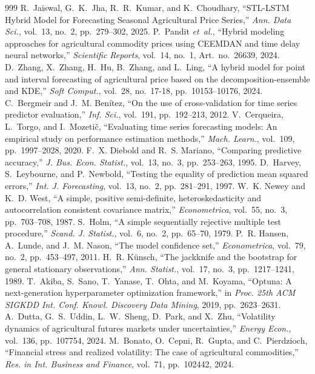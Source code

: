 \begin{thebibliography}{999}
 R.~Jaiswal, G.~K.~Jha, R.~R.~Kumar, and K.~Choudhary, ``STL-LSTM Hybrid Model for Forecasting Seasonal Agricultural Price Series,'' \emph{Ann. Data Sci.}, vol.~13, no.~2, pp.~279--302, 2025.
 P.~Pandit \emph{et~al.}, ``Hybrid modeling approaches for agricultural commodity prices using CEEMDAN and time delay neural networks,'' \emph{Scientific Reports}, vol.~14, no.~1, Art.\ no.~26639, 2024.
 D.~Zhang, X.~Zhang, H.~Hu, B.~Zhang, and L.~Ling, ``A hybrid model for point and interval forecasting of agricultural price based on the decomposition-ensemble and KDE,'' \emph{Soft Comput.}, vol.~28, no.~17-18, pp.~10153--10176, 2024.
 C.~Bergmeir and J.~M. Ben\'{i}tez, ``On the use of cross-validation for time series predictor evaluation,'' \emph{Inf. Sci.}, vol.~191, pp.~192--213, 2012.
 V.~Cerqueira, L.~Torgo, and I.~Mozeti\v{c}, ``Evaluating time series forecasting models: An empirical study on performance estimation methods,'' \emph{Mach. Learn.}, vol.~109, pp.~1997--2028, 2020.
 F.~X. Diebold and R.~S. Mariano, ``Comparing predictive accuracy,'' \emph{J. Bus. Econ. Statist.}, vol.~13, no.~3, pp.~253--263, 1995.
 D.~Harvey, S.~Leybourne, and P.~Newbold, ``Testing the equality of prediction mean squared errors,'' \emph{Int. J. Forecasting}, vol.~13, no.~2, pp.~281--291, 1997.
 W.~K. Newey and K.~D. West, ``A simple, positive semi-definite, heteroskedasticity and autocorrelation consistent covariance matrix,'' \emph{Econometrica}, vol.~55, no.~3, pp.~703--708, 1987.
 S.~Holm, ``A simple sequentially rejective multiple test procedure,'' \emph{Scand. J. Statist.}, vol.~6, no.~2, pp.~65--70, 1979.
 P.~R. Hansen, A.~Lunde, and J.~M. Nason, ``The model confidence set,'' \emph{Econometrica}, vol.~79, no.~2, pp.~453--497, 2011.
 H.~R. K\"{u}nsch, ``The jackknife and the bootstrap for general stationary observations,'' \emph{Ann. Statist.}, vol.~17, no.~3, pp.~1217--1241, 1989.
 T.~Akiba, S.~Sano, T.~Yanase, T.~Ohta, and M.~Koyama, ``Optuna: A next-generation hyperparameter optimization framework,'' in \emph{Proc. 25th ACM SIGKDD Int. Conf. Knowl. Discovery Data Mining}, 2019, pp.~2623--2631.
 A.~Dutta, G.~S.~Uddin, L.~W.~Sheng, D.~Park, and X.~Zhu, ``Volatility dynamics of agricultural futures markets under uncertainties,'' \emph{Energy Econ.}, vol.~136, pp.~107754, 2024.
 M.~Bonato, O.~Cepni, R.~Gupta, and C.~Pierdzioch, ``Financial stress and realized volatility: The case of agricultural commodities,'' \emph{Res. in Int. Business and Finance}, vol.~71, pp.~102442, 2024.

\end{thebibliography}
